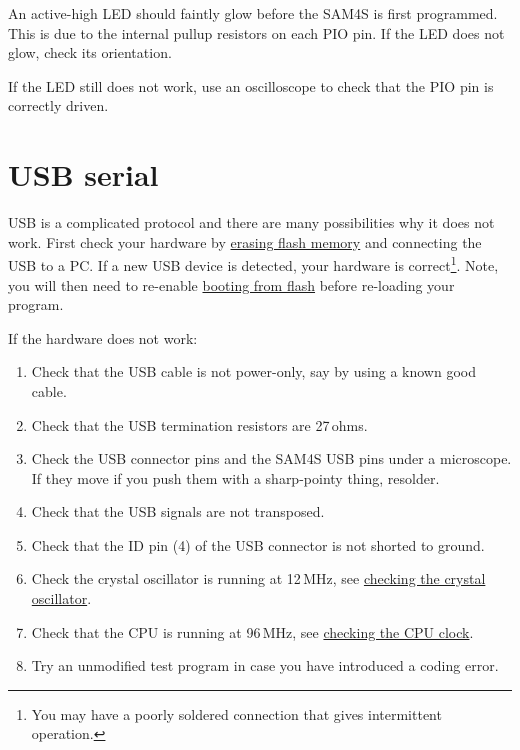 An active-high LED should faintly glow before the SAM4S is first
programmed.  This is due to the internal pullup resistors on each PIO
pin.  If the LED does not glow, check its orientation.

If the LED still does not work, use an oscilloscope to check that the
PIO pin is correctly driven.


\section{USB serial}
\label{debugging-usb}

USB is a complicated protocol and there are many possibilities why it
does not work.  First check your hardware by
\hyperref[erasing-flash-memory]{erasing flash memory} and connecting
the USB to a PC.  If a new USB device is detected, your hardware is
correct\footnote{You may have a poorly soldered connection that gives
  intermittent operation.}.  Note, you will then need to re-enable
\hyperref[booting-from-flash-memory]{booting from flash} before
re-loading your program.

If the hardware does not work:
%
\begin{enumerate}
  \item Check that the USB cable is not power-only, say by using a
    known good cable.

  \item
    Check that the USB termination resistors are 27\,ohms.

  \item Check the USB connector pins and the SAM4S USB pins under a
    microscope.  If they move if you push them with a sharp-pointy
    thing, resolder.

  \item
    Check that the USB signals are not transposed.

  \item Check that the ID pin (4) of the USB connector is not shorted
    to ground.

  \item Check the crystal oscillator is running at 12\,MHz, see
    \protect\hyperref[checking-the-crystal-oscillator]{checking the
      crystal oscillator}.

  \item Check that the CPU is running at 96\,MHz, see
    \protect\hyperref[checking-the-clock]{checking the CPU clock}.

  \item Try an unmodified test program in case you have introduced a
    coding error.
\end{enumerate}

